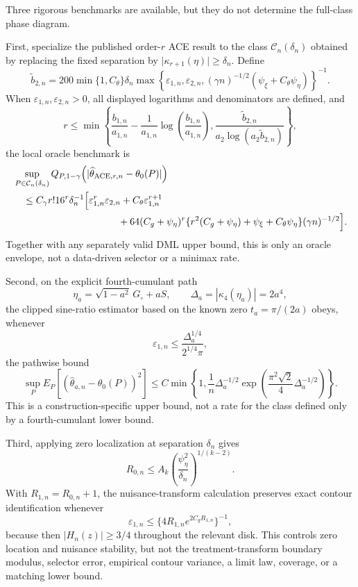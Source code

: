 Three rigorous benchmarks are available, but they do not determine the full-class phase diagram.

First, specialize the published order-\(r\) ACE result to the class
\(\mathcal C_n(\delta_n)\) obtained by replacing the fixed separation by
\(\lvert\kappa_{r+1}(\eta)\rvert\ge\delta_n\).  Define
\[
 \widetilde b_{2,n}
 =200\min\{1,C_{\theta}\}\delta_n
 \max\!\left\{
   \varepsilon_{1,n},\varepsilon_{2,n},
   (\gamma n)^{-1/2}(\psi_{\xi}+C_{\theta}\psi_{\eta})
 \right\}^{-1}.
\]
When \(\varepsilon_{1,n},\varepsilon_{2,n}>0\), all displayed logarithms and denominators are defined, and
\[
 r\le
 \min\!\left\{
   \frac{b_{1,n}}{a_{1,n}}
   -\frac{1}{a_{1,n}}\log\!\left(\frac{b_{1,n}}{a_{1,n}}\right),
   \frac{\widetilde b_{2,n}}{a_2\log(a_2\widetilde b_{2,n})}
 \right\},
\]
the local oracle benchmark is
\[
\begin{aligned}
 &\sup_{P\in\mathcal C_n(\delta_n)}
 Q_{P,1-\gamma}
 \!\left(|\widehat\theta_{\mathrm{ACE},r,n}-\theta_0(P)|\right)\\
 &\quad\le
 C_{\gamma}r!16^r\delta_n^{-1}
 \Bigl[
   \varepsilon_{1,n}^r\varepsilon_{2,n}
   +C_{\theta}\varepsilon_{1,n}^{r+1}\\
 &\hspace{38mm}
   +64(C_g+\psi_{\eta})^r
    \{r^2(C_g+\psi_{\eta})+\psi_{\xi}+C_{\theta}\psi_{\eta}\}
    (\gamma n)^{-1/2}
 \Bigr].
\end{aligned}
\]
Together with any separately valid DML upper bound, this is only an oracle envelope, not a data-driven selector or a minimax rate.

Second, on the explicit fourth-cumulant path
\[
 \eta_a=\sqrt{1-a^2}\,G_{\circ}+aS,
 \qquad
 \Delta_a=|\kappa_4(\eta_a)|=2a^4,
\]
the clipped sine-ratio estimator based on the known zero \(t_a=\pi/(2a)\) obeys, whenever
\[
 \varepsilon_{1,n}
 \le\frac{\Delta_a^{1/4}}{2^{1/4}\pi},
\]
the pathwise bound
\[
 \sup_P E_P[(\widehat\theta_{a,n}-\theta_0(P))^2]
 \le
 C\min\!\left\{
  1,\frac{1}{n}\Delta_a^{-1/2}
  \exp\!\left(\frac{\pi^2\sqrt2}{4}\Delta_a^{-1/2}\right)
 \right\}.
\]
This is a construction-specific upper bound, not a rate for the class defined only by a fourth-cumulant lower bound.

Third, applying zero localization at separation \(\delta_n\) gives
\[
 R_{0,n}\le A_k
 \left(\frac{\psi_{\eta}^2}{\delta_n}\right)^{1/(k-2)}.
\]
With \(R_{1,n}=R_{0,n}+1\), the nuisance-transform calculation preserves exact contour identification whenever
\[
 \varepsilon_{1,n}
 \le\{4R_{1,n}e^{2C_gR_{1,n}}\}^{-1},
\]
because then \(|H_n(z)|\ge3/4\) throughout the relevant disk.  This controls zero location and nuisance stability, but not the treatment-transform boundary modulus, selector error, empirical contour variance, a limit law, coverage, or a matching lower bound.